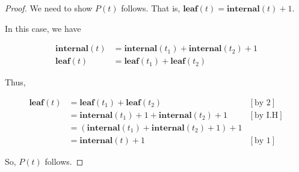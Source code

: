\documentclass[12pt]{article}
\begin{document}
\begin{itemize}
\begin{proof}
    \bigskip

    We need to show $P(t)$ follows. That is, $\textbf{leaf}(t) =
    \textbf{internal}(t) + 1$.

    \bigskip

    In this case, we have

    \setcounter{equation}{0}
    \begin{align}
        \textbf{internal}(t) &= \textbf{internal}(t_1) + \textbf{internal}(t_2) + 1\\
        \textbf{leaf}(t) &= \textbf{leaf}(t_1) + \textbf{leaf}(t_2)
    \end{align}

    \bigskip

    Thus,

    \begin{align}
        \textbf{leaf}(t) &= \textbf{leaf}(t_1) + \textbf{leaf}(t_2) & [\text{by 2}]\\
        &= \textbf{internal}(t_1) + 1 + \textbf{internal}(t_2) + 1 & [\text{by I.H}]\\
        &= (\textbf{internal}(t_1) + \textbf{internal}(t_2) + 1) + 1 \\
        &= \textbf{internal}(t) + 1 & [\text{by 1}]
    \end{align}

    \bigskip

    So, $P(t)$ follows.

    \end{proof}









\end{itemize}
\end{document}
